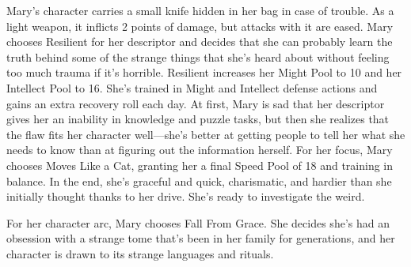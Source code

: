 Mary’s character carries a small knife hidden in her bag in case of trouble. As a light weapon, it inflicts 2 points of damage, but attacks with it are eased.
Mary chooses Resilient for her descriptor and decides that she can probably learn the truth behind some of the strange things that she’s heard about without feeling too much trauma if it’s horrible. Resilient increases her Might Pool to 10 and her Intellect Pool to 16. She’s trained in Might and Intellect defense actions and gains an extra recovery roll each day. At first, Mary is sad that her descriptor gives her an inability in knowledge and puzzle tasks, but then she realizes that the flaw fits her character well—she’s better at getting people to tell her what she needs to know than at figuring out the information herself.
For her focus, Mary chooses Moves Like a Cat, granting her a final Speed Pool of 18 and training in balance. In the end, she’s graceful and quick, charismatic, and hardier than she initially thought thanks to her drive. She’s ready to investigate the weird.

For her character arc, Mary chooses Fall From Grace. She decides she’s had an obsession with a strange tome that’s been in her family for generations, and her character is drawn to its strange languages and rituals.
